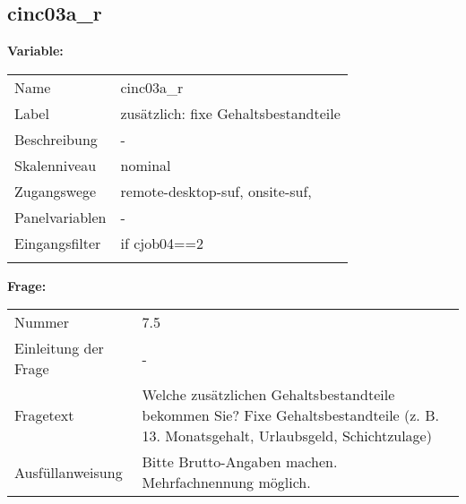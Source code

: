 	
	
	\subsection{cinc03a\_r}
	\label{subSection:cinc03a_r}

	\noindent\textbf{Variable:}\\
		\begin{tabular}{lL{11.3cm}}
			\label{tableVariable:cinc03a_r}
			Name & cinc03a\_r \\
			Label & zusätzlich: fixe Gehaltsbestandteile \\
			Beschreibung & - \\
			Skalenniveau & nominal \\
			Zugangswege &
				remote-desktop-suf,
				onsite-suf,
 \\
			Panelvariablen & -
			 \\
			Eingangsfilter & if cjob04==2 \\
 \\
		\end{tabular}

		\vspace*{1 cm}
		\noindent\textbf{Frage:}\\
		\begin{tabular}{lL{11.3cm}}
			\label{tableQuestion:cinc03a_r}
			Nummer & 7.5 \\
			Einleitung der Frage & - \\
			Fragetext & Welche zusätzlichen Gehaltsbestandteile bekommen Sie?
Fixe Gehaltsbestandteile
(z. B. 13. Monatsgehalt, Urlaubsgeld, Schichtzulage) \\
			Ausfüllanweisung & 
Bitte Brutto-Angaben machen. Mehrfachnennung möglich. \\
		\end{tabular}





